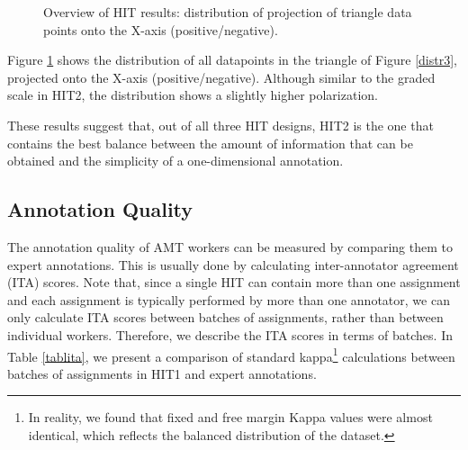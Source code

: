 \documentclass[11pt, a4paper,onecolumn]{article}
\begin{document}
\begin{figure}
  \begin{center}
	\caption{Overview of HIT results: distribution of projection of triangle data points onto the X-axis (positive/negative).}
	\label{distr3b}
  \end{center}
\end{figure}


Figure \ref{distr3b} shows the distribution of all datapoints in the triangle of Figure \ref{distr3}, projected onto the X-axis (positive/negative). Although similar to the graded scale in HIT2, the distribution shows a slightly higher polarization.

These results suggest that, out of all three HIT designs, HIT2 is the one that contains the best balance between the amount of information that can be obtained and the simplicity of a one-dimensional annotation. 



\subsection{Annotation Quality}
\label{sect:quality}

The annotation quality of AMT workers can be measured by comparing them to expert annotations. This is usually done by calculating inter-annotator agreement (ITA) scores. Note that, since a single HIT can contain more than one assignment and each assignment is typically performed by more than one annotator, we can only calculate ITA scores between batches of assignments, rather than between individual workers. Therefore, we describe the ITA scores in terms of batches. In Table \ref{tablita}, we present a comparison of standard kappa\footnote{In reality, we found that fixed and free margin Kappa values were almost identical, which reflects the balanced distribution of the dataset.} calculations \cite{eugenio_kappa_2004} between batches of assignments in HIT1 and expert annotations.
\end{document}
